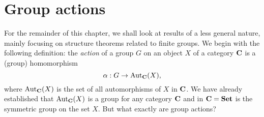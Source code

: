 \section{Group actions}

For the remainder of this chapter, we shall look at results of a less general
nature, mainly focusing on structure theorems related to finite groups. We begin
with the following definition: the \emph{action} of a group \(G\) on an object
\(X\) of a category \(\mathbf{C}\) is a (group) homomorphism
\[
    \alpha: G \to \operatorname{Aut}_{\mathbf{C}}(X),
\]
where \(\operatorname{Aut}_{\mathbf{C}}(X)\) is the set of all automorphisms of \(X\) in
\(\mathbf{C}\). We have already established that \(\operatorname{Aut}_{\mathbf{C}}(X)\) is a group
for any category \(\mathbf{C}\) and in \(\mathbf{C} = \mathbf{Set}\) is the symmetric group
on the set \(X\). But what exactly are group actions?

